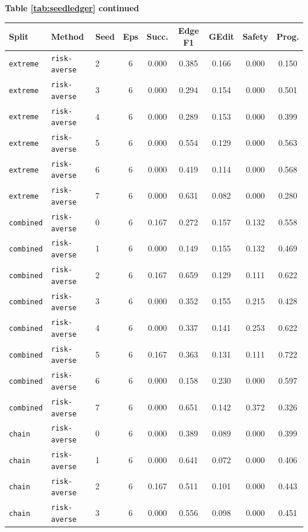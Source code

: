 \documentclass{article}
\begin{document}
\begin{center}
\textbf{Table \ref{tab:seedledger} continued}\\[0.4ex]
\begin{tabular}{lllcccccc}
\toprule
Split & Method & Seed & Eps & Succ. & Edge F1 & GEdit & Safety & Prog. \\
\midrule
\texttt{extreme} & \texttt{risk-averse} & 2 & 6 & 0.000 & 0.385 & 0.166 & 0.000 & 0.150 \\
\texttt{extreme} & \texttt{risk-averse} & 3 & 6 & 0.000 & 0.294 & 0.154 & 0.000 & 0.501 \\
\texttt{extreme} & \texttt{risk-averse} & 4 & 6 & 0.000 & 0.289 & 0.153 & 0.000 & 0.399 \\
\texttt{extreme} & \texttt{risk-averse} & 5 & 6 & 0.000 & 0.554 & 0.129 & 0.000 & 0.563 \\
\texttt{extreme} & \texttt{risk-averse} & 6 & 6 & 0.000 & 0.419 & 0.114 & 0.000 & 0.568 \\
\texttt{extreme} & \texttt{risk-averse} & 7 & 6 & 0.000 & 0.631 & 0.082 & 0.000 & 0.280 \\
\texttt{combined} & \texttt{risk-averse} & 0 & 6 & 0.167 & 0.272 & 0.157 & 0.132 & 0.558 \\
\texttt{combined} & \texttt{risk-averse} & 1 & 6 & 0.000 & 0.149 & 0.155 & 0.132 & 0.469 \\
\texttt{combined} & \texttt{risk-averse} & 2 & 6 & 0.167 & 0.659 & 0.129 & 0.111 & 0.622 \\
\texttt{combined} & \texttt{risk-averse} & 3 & 6 & 0.000 & 0.352 & 0.155 & 0.215 & 0.428 \\
\texttt{combined} & \texttt{risk-averse} & 4 & 6 & 0.000 & 0.337 & 0.141 & 0.253 & 0.622 \\
\texttt{combined} & \texttt{risk-averse} & 5 & 6 & 0.167 & 0.363 & 0.131 & 0.111 & 0.722 \\
\texttt{combined} & \texttt{risk-averse} & 6 & 6 & 0.000 & 0.158 & 0.230 & 0.000 & 0.597 \\
\texttt{combined} & \texttt{risk-averse} & 7 & 6 & 0.000 & 0.651 & 0.142 & 0.372 & 0.326 \\
\texttt{chain} & \texttt{risk-averse} & 0 & 6 & 0.000 & 0.389 & 0.089 & 0.000 & 0.399 \\
\texttt{chain} & \texttt{risk-averse} & 1 & 6 & 0.000 & 0.641 & 0.072 & 0.000 & 0.406 \\
\texttt{chain} & \texttt{risk-averse} & 2 & 6 & 0.167 & 0.511 & 0.101 & 0.000 & 0.443 \\
\texttt{chain} & \texttt{risk-averse} & 3 & 6 & 0.000 & 0.556 & 0.098 & 0.000 & 0.451 \\

\end{tabular}
\end{center}
\end{document}

